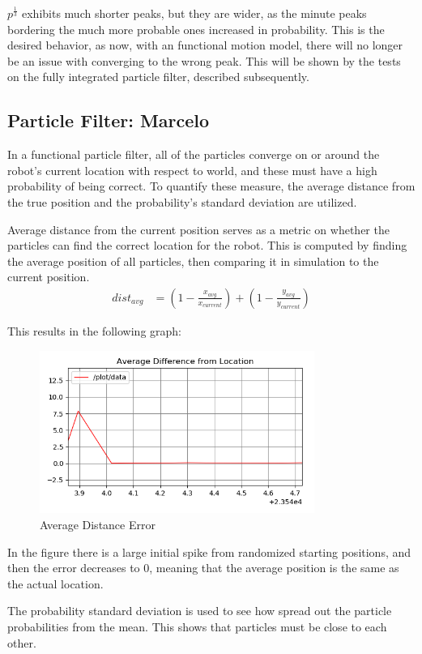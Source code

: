 \documentclass{article}
\begin{document}
 $p^{\frac{1}{3}}$ exhibits much shorter peaks, but they are wider, as the minute peaks bordering the much more probable ones increased in probability. This is the desired behavior, as now, with an functional motion model, there will no longer be an issue with converging to the wrong peak. This will be shown by the tests on the fully integrated particle filter, described subsequently.
\subsection{Particle Filter: Marcelo}
In a functional particle filter, all of the particles converge on or around the robot's current location with respect to world, and these must have a high probability of being correct. To quantify these measure, the average distance from the true position and the probability's standard deviation are utilized.

Average distance from the current position serves as a metric on whether the particles can find the correct location for the robot. This is computed by finding the average position of all particles, then comparing it in simulation to the current position.
\begin{align}
    dist_{avg} &= (1-\frac{x_{avg}}{x_{current}}) + (1-\frac{y_{avg}}{y_{current}})
\end{align}

This results in the following graph:
\begin{figure}[H]
    \centering
    \includegraphics[width=0.8\textwidth]{avg_dist.png}
    \caption{Average Distance Error}
    \label{fig:avg-dist}
\end{figure}
In the figure there is a large initial spike from randomized starting positions, and then the error decreases to 0, meaning that the average position is the same as the actual location.

The probability standard deviation is used to see how spread out the particle probabilities from the mean. This shows that particles must be close to each other.
\end{document}
